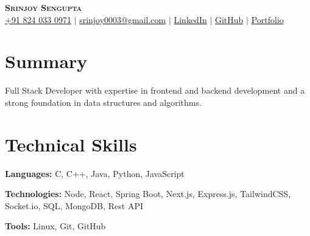 \documentclass[letterpaper,11pt]{article}
\newcommand{\resumeSubHeadingListStart}{\begin{itemize}[leftmargin=0.15in, label={}]}
\newcommand{\resumeSubHeadingListEnd}{\end{itemize}}
\begin{document}

\begin{center}
    \textbf{\Huge \scshape Srinjoy Sengupta} \\ \vspace{3pt}
    \small
    \faMobile \hspace{.5pt} \href{tel:918240330971}{+91 824 033 0971}
    $|$
    \faAt \hspace{.5pt} \href{srinjoy003@gmail.com}{srinjoy0003@gmail.com}
    $|$
    \faLinkedinSquare \hspace{.5pt} \href{https://linkedin.com/in/srinjoy-sengupta-b28565302}{LinkedIn}
    $|$
    \faGithub \hspace{.5pt} \href{https://github.com/Srinjoy003}{GitHub}
    $|$
    \faGlobe \hspace{.5pt} \href{https://srinjoysengupta.vercel.app/}{Portfolio}
\end{center}


\section{Summary}
  \vspace{2pt}
  \small{
  Full Stack Developer with expertise in frontend and backend development and a strong foundation in data structures and algorithms.
  }




\section{Technical Skills}
  \vspace{2pt}
  \resumeSubHeadingListStart
    \small{\item{
        
        \textbf{Languages:}{ C, C++, Java, Python, JavaScript} \\ \vspace{3pt}
        
        \textbf{Technologies:}{ Node, React, Spring Boot, Next.js, Express.js, TailwindCSS, Socket.io, SQL, MongoDB, Rest API } \\ \vspace{3pt}
        
        \textbf{Tools:}{ Linux, Git, GitHub} \\ \vspace{3pt}
        
    }}
  \resumeSubHeadingListEnd
\end{document}
